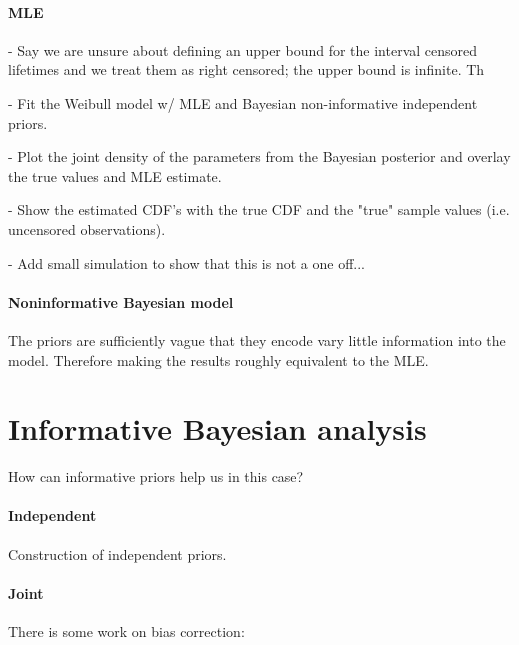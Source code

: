 \paragraph*{MLE}

- Say we are unsure about defining an upper bound for the interval censored lifetimes and we treat them as right censored; the upper bound is infinite. Th

- Fit the Weibull model w/ MLE and Bayesian non-informative independent priors.

- Plot the joint density of the parameters from the Bayesian posterior and overlay the true values and MLE estimate.

- Show the estimated CDF's with the true CDF and the "true" sample values (i.e. uncensored observations).

- Add small simulation to show that this is not a one off...

\paragraph*{Noninformative Bayesian model}

The priors are sufficiently vague that they encode vary little information into the model. Therefore making the results roughly equivalent to the MLE.

\section{Informative Bayesian analysis}

How can informative priors help us in this case?

\paragraph*{Independent}

Construction of independent priors.

\paragraph*{Joint}

There is some work on bias correction:

